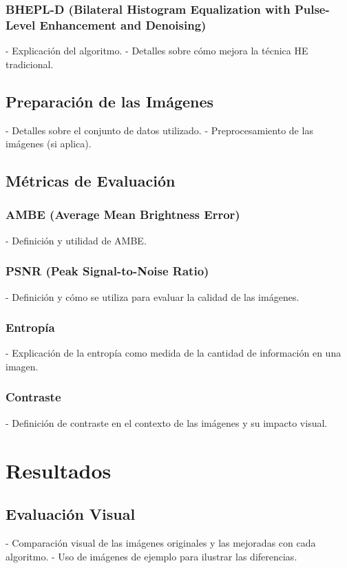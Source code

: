 \documentclass[sigchi]{acmart}
\begin{document}
\subsubsection{BHEPL-D (Bilateral Histogram Equalization with Pulse-Level Enhancement and Denoising)}
- Explicación del algoritmo.
- Detalles sobre cómo mejora la técnica HE tradicional.

\subsection{Preparación de las Imágenes}
- Detalles sobre el conjunto de datos utilizado.
- Preprocesamiento de las imágenes (si aplica).

\subsection{Métricas de Evaluación}
\subsubsection{AMBE (Average Mean Brightness Error)}
- Definición y utilidad de AMBE.

\subsubsection{PSNR (Peak Signal-to-Noise Ratio)}
- Definición y cómo se utiliza para evaluar la calidad de las imágenes.

\subsubsection{Entropía}
- Explicación de la entropía como medida de la cantidad de información en una imagen.

\subsubsection{Contraste}
- Definición de contraste en el contexto de las imágenes y su impacto visual.

\section{Resultados}
\subsection{Evaluación Visual}
- Comparación visual de las imágenes originales y las mejoradas con cada algoritmo.
- Uso de imágenes de ejemplo para ilustrar las diferencias.
\end{document}
